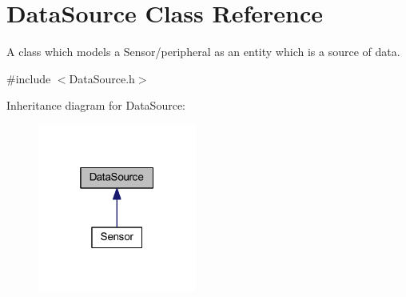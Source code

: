 \hypertarget{class_data_source}{}\section{Data\+Source Class Reference}
\label{class_data_source}


A class which models a Sensor/peripheral as an entity which is a source of data.  




{\ttfamily \#include $<$Data\+Source.\+h$>$}



Inheritance diagram for Data\+Source\+:
\nopagebreak
\begin{figure}[H]
\begin{center}
\leavevmode
\includegraphics[width=148pt]{class_data_source__inherit__graph}
\end{center}
\end{figure}
